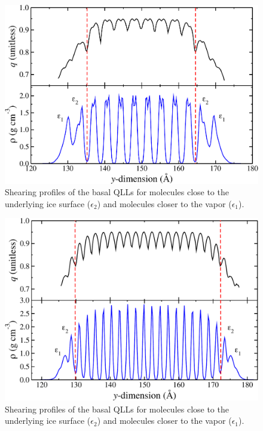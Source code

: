 \begin{figure}
\includegraphics[width=\linewidth]{Figures/basal_rhoq}
\caption{\label{fig:basal_rhoq} Shearing profiles of the basal QLLs for
  molecules close to the underlying ice surface ($\epsilon_{2}$) and
  molecules closer to the vapor ($\epsilon_{1}$). }
\end{figure}                


\begin{figure}
\includegraphics[width=\linewidth]{Figures/prism_rhoq}
\caption{\label{fig:prism_rhoq} Shearing profiles of the basal QLLs for
  molecules close to the underlying ice surface ($\epsilon_{2}$) and
  molecules closer to the vapor ($\epsilon_{1}$). }
\end{figure}                



